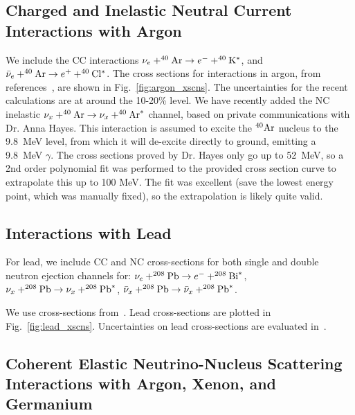 \documentclass{article}
\begin{document}
\subsection{Charged and Inelastic Neutral Current Interactions with Argon}

We include the CC interactions $\nu_e + ^{40}{\rm Ar} \rightarrow e^- + ^{40}{\rm K^*}$, and $\bar{\nu}_e + ^{40}{\rm Ar} \rightarrow e^+ + ^{40}{\rm Cl^*}$. The cross sections for interactions in argon, from references~\cite{GilBotella:2004bv,Kolbe:2003ys}, are shown in Fig.~\ref{fig:argon_xscns}.   The uncertainties for the recent calculations are at around the 10-20\% level. We have recently added the NC inelastic $\nu_x + ^{40}{\rm Ar} \rightarrow \nu_x+ ^{40}{\rm Ar}^*$ channel, based on private communications with Dr. Anna Hayes.  This interaction is assumed to excite the $^{40}{\rm Ar}$ nucleus to the 9.8~MeV level, from which it will de-excite directly to ground, emitting a 9.8~MeV $\gamma$. The cross sections proved by Dr. Hayes only go up to 52~MeV, so a 2nd order polynomial fit was performed to the provided cross section curve to extrapolate this up to 100 MeV.  The fit was excellent (save the lowest energy point, which was manually fixed), so the extrapolation is likely quite valid.

\subsection{Interactions with Lead}

For lead, we include CC and NC cross-sections for both single and double
neutron ejection channels for:
$\nu_e + ^{208}{\rm Pb} \rightarrow e^- + ^{208}{\rm Bi}^{*}$,
$\nu_x + ^{208}{\rm Pb} \rightarrow \nu_x + ^{208}{\rm Pb}^{*}$,
$\bar{\nu}_x + ^{208}{\rm Pb} \rightarrow \bar{\nu}_x + ^{208}{\rm Pb}^{*}$.

We use cross-sections from~\cite{Engel:2002hg}. Lead cross-sections are plotted in Fig.~\ref{fig:lead_xscns}. Uncertainties on lead cross-sections are evaluated in~\cite{Paar:2011pz}.

\subsection{Coherent Elastic Neutrino-Nucleus Scattering Interactions with Argon, Xenon, and Germanium} \label{subsec:cevxsec}
\end{document}
